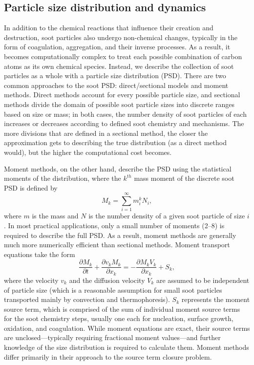 \documentclass[preprint,letterpaper]{elsarticle}
\begin{document}
\subsection{Particle size distribution and dynamics}
\label{ss:PSD_dynamics}

In addition to the chemical reactions that influence their creation and destruction, soot particles also undergo non-chemical changes, typically in the form of coagulation, aggregation, and their inverse processes. As a result, it becomes computationally complex to treat each possible combination of carbon atoms as its own chemical species. Instead, we describe the collection of soot particles as a whole with a particle size distribution (PSD). There are two common approaches to the soot PSD: direct/sectional models and moment methods. Direct methods account for every possible particle size, and sectional methods divide the domain of possible soot particle sizes into discrete ranges based on size or mass; in both cases, the number density of soot particles of each increases or decreases according to defined soot chemistry and mechanisms. The more divisions that are defined in a sectional method, the closer the approximation gets to describing the true distribution (as a direct method would), but the higher the computational cost becomes.

Moment methods, on the other hand, describe the PSD using the statistical moments of the distribution, where the $k^{th}$ mass moment of the discrete soot PSD is defined by
\begin{equation}
    M_k = \sum_{i=1}^{\infty} m_i^k N_i,
\end{equation}
where $m$ is the mass and $N$ is the number density of a given soot particle of size $i$. In most practical applications, only a small number of moments (2--8) is required to describe the full PSD. As a result, moment methods are generally much more numerically efficient than sectional methods. Moment transport equations take the form
\begin{equation}
    \label{e:momTransEq}
    \frac{\partial M_k}{\partial t} + \frac{\partial v_k M_k}{\partial x_k} = -\frac{\partial M_k V_k}{\partial x_k} + S_k,
\end{equation}
where the velocity $v_k$ and the diffusion velocity $V_k$ are assumed to be independent of particle size (which is a reasonable assumption for small soot particles transported mainly by convection and thermophoresis). $S_k$ represents the moment source term, which is comprised of the sum of individual moment source terms for the soot chemistry steps, usually one each for nucleation, surface growth, oxidation, and coagulation. While moment equations are exact, their source terms are unclosed---typically requiring fractional moment values---and further knowledge of the size distribution is required to calculate them. Moment methods differ primarily in their approach to the source term closure problem.
\end{document}
